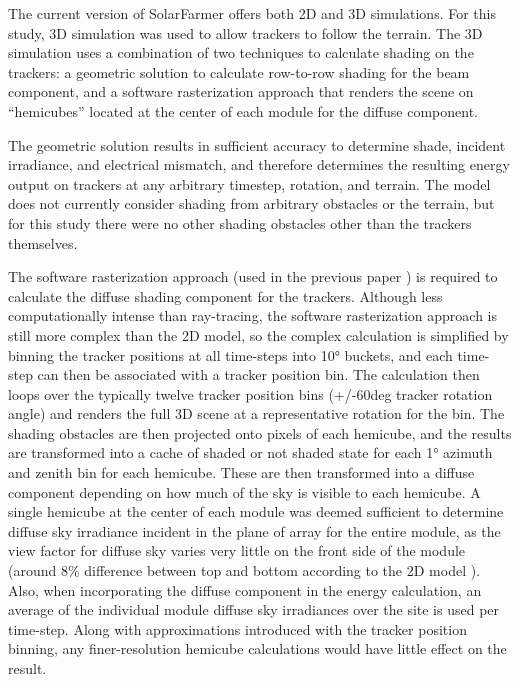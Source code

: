 \documentclass[conference]{IEEEtran}
\begin{document}
The current version of SolarFarmer offers both 2D and 3D simulations. For this study, 3D simulation was used to allow trackers to follow the terrain. The 3D simulation uses a combination of two techniques to calculate shading on the trackers: a geometric solution to calculate row-to-row shading for the beam component, and a software rasterization approach that renders the scene on “hemicubes” located at the center of each module for the diffuse component. 

The geometric solution results in sufficient accuracy to determine shade, incident irradiance, and electrical mismatch, and therefore determines the resulting energy output on trackers at any arbitrary timestep, rotation, and terrain. The model does not currently consider shading from arbitrary obstacles or the terrain, but for this study there were no other shading obstacles other than the trackers themselves.

The software rasterization approach (used in the previous paper \cite{Mikofski_9300381}) is required to calculate the diffuse shading component for the trackers. Although less computationally intense than ray-tracing, the software rasterization approach is still more complex than the 2D model, so the complex calculation is simplified by binning the tracker positions at all time-steps into 10° buckets, and each time-step can then be associated with a tracker position bin. The calculation then loops over the typically twelve tracker position bins (+/-60deg tracker rotation angle) and renders the full 3D scene at a representative rotation for the bin. The shading obstacles are then projected onto pixels of each hemicube, and the results are transformed into a cache of shaded or not shaded state for each 1° azimuth and zenith bin for each hemicube. These are then transformed into a diffuse component depending on how much of the sky is visible to each hemicube. A single hemicube at the center of each module was deemed sufficient to determine diffuse sky irradiance incident in the plane of array for the entire module, as the view factor for diffuse sky varies very little on the front side of the module (around 8\% difference between top and bottom according to the 2D model \cite{Mikofski_8980572}). Also, when incorporating the diffuse component in the energy calculation, an average of the individual module diffuse sky irradiances over the site is used per time-step. Along with approximations introduced with the tracker position binning, any finer-resolution hemicube calculations would have little effect on the result.
\end{document}
